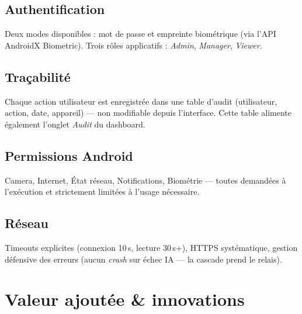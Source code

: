 \documentclass[11pt,a4paper]{article}
\begin{document}
\subsection{Authentification}
Deux modes disponibles : mot de passe et empreinte biométrique (via
l'API AndroidX Biometric). Trois rôles applicatifs : \emph{Admin},
\emph{Manager}, \emph{Viewer}.

\subsection{Traçabilité}
Chaque action utilisateur est enregistrée dans une table d'audit
(utilisateur, action, date, appareil) — non modifiable depuis
l'interface. Cette table alimente également l'onglet \emph{Audit} du
dashboard.

\subsection{Permissions Android}
Camera, Internet, État réseau, Notifications, Biométrie — toutes
demandées à l'exécution et strictement limitées à l'usage nécessaire.

\subsection{Réseau}
Timeouts explicites (connexion 10\,s, lecture 30\,s+), HTTPS
systématique, gestion défensive des erreurs (aucun \emph{crash} sur
échec IA — la cascade prend le relais).

\section{Valeur ajoutée \& innovations}
\end{document}
